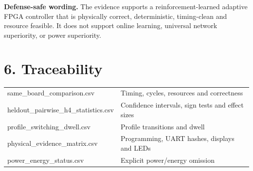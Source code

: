 \documentclass[10pt,a4paper]{article}
\newcommand{\resultbox}[2]{
  \noindent\colorbox{#1}{\parbox{0.965\linewidth}{#2}}
}
\begin{document}
\resultbox{PaleRed}{
\textbf{Defense-safe wording.}
The evidence supports a reinforcement-learned adaptive FPGA controller
that is physically correct, deterministic, timing-clean and resource
feasible. It does not support online learning, universal network
superiority, or power superiority.
}

\section*{6. Traceability}

\begin{tabularx}{\textwidth}{>{\ttfamily\scriptsize}p{5.2cm}X}
same\_board\_comparison.csv & Timing, cycles, resources and correctness \\
heldout\_pairwise\_h4\_statistics.csv & Confidence intervals, sign tests and effect sizes \\
profile\_switching\_dwell.csv & Profile transitions and dwell \\
physical\_evidence\_matrix.csv & Programming, UART hashes, displays and LEDs \\
power\_energy\_status.csv & Explicit power/energy omission \\
\end{tabularx}
\end{document}
